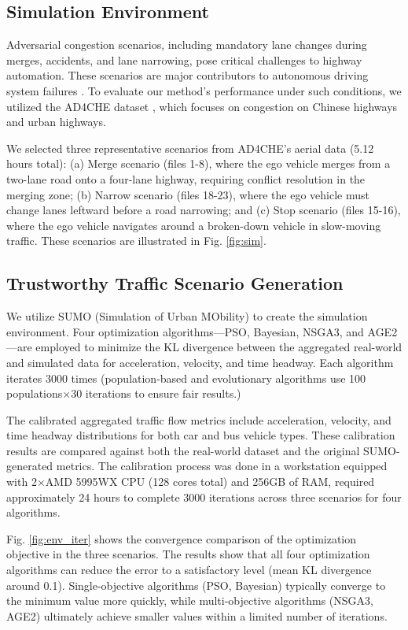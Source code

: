 \subsection{Simulation Environment}
Adversarial congestion scenarios, including mandatory lane changes during merges, accidents, and lane narrowing, pose critical challenges to highway automation. These scenarios are major contributors to autonomous driving system failures \cite{naturecrash, nordhoff2024conceptual}. To evaluate our method's performance under such conditions, we utilized the AD4CHE dataset \cite{AD4CHE}, which focuses on congestion on Chinese highways and urban highways.

We selected three representative scenarios from AD4CHE's aerial data (5.12 hours total): (a) Merge scenario (files 1-8), where the ego vehicle merges from a two-lane road onto a four-lane highway, requiring conflict resolution in the merging zone; (b) Narrow scenario (files 18-23), where the ego vehicle must change lanes leftward before a road narrowing; and (c) Stop scenario (files 15-16), where the ego vehicle navigates around a broken-down vehicle in slow-moving traffic.  These scenarios are illustrated in Fig. \ref{fig:sim}.

\subsection{Trustworthy Traffic Scenario Generation}

We utilize SUMO\cite{SUMO2018} (Simulation of Urban MObility) to create the simulation environment. Four optimization algorithms—PSO\cite{pso}, Bayesian\cite{bayesian}, NSGA3\cite{NSGA3}, and AGE2\cite{AGE2}—are employed to minimize the KL divergence between the aggregated real-world and simulated data for acceleration, velocity, and time headway. Each algorithm iterates 3000 times (population-based and evolutionary algorithms use 100 populations$\times$30 iterations to ensure fair results.)

The calibrated aggregated traffic flow metrics include acceleration, velocity, and time headway distributions for both car and bus vehicle types. These calibration results are compared against both the real-world dataset and the original SUMO-generated metrics. The calibration process was done in a workstation equipped with 2$\times$AMD 5995WX CPU (128 cores total) and 256GB of RAM, required approximately 24 hours to complete 3000 iterations across three scenarios for four algorithms.

Fig. \ref{fig:env_iter} shows the convergence comparison of the optimization objective in the three scenarios. The results show that all four optimization algorithms can reduce the error to a satisfactory level (mean KL divergence around 0.1). Single-objective algorithms (PSO, Bayesian) typically converge to the minimum value more quickly, while multi-objective algorithms (NSGA3, AGE2) ultimately achieve smaller values within a limited number of iterations. 

